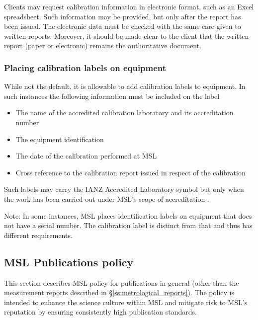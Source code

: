 Clients may request calibration information in electronic format, such as an Excel spreadsheet. Such information may be provided, but only after the report has been issued. The electronic data must be checked with the same care given to written reports. Moreover, it should be made clear to the client that the written report (paper or electronic) remains the authoritative document.

\subsubsection{Placing calibration labels on equipment}
While not the default, it is allowable to add calibration labels to equipment.  In such instances the following information must be included on the label
\begin{itemize}
\item The name of the accredited calibration laboratory and its accreditation number
\item The equipment identification
\item The date of the calibration performed at MSL
\item Cross reference to the calibration report issued in respect of the calibration
\end{itemize}

Such labels may carry the IANZ Accredited Laboratory symbol but only when the work has been carried out under MSL’s scope of accreditation \cite{IANZ_Specific_Criteria}.

Note:  In some instances, MSL places identification labels on equipment that does not have a serial number.  The calibration label is distinct from that and thus has different requirements.


\subsection{MSL Publications policy}
\label{ss:msl_publications_policy}

This section describes MSL policy for publications in general (other than the measurement reports described in \S\ref{ss:metrological_reports}). The policy is intended to enhance the science culture within MSL and mitigate risk to MSL's reputation by ensuring consistently high publication standards.   


